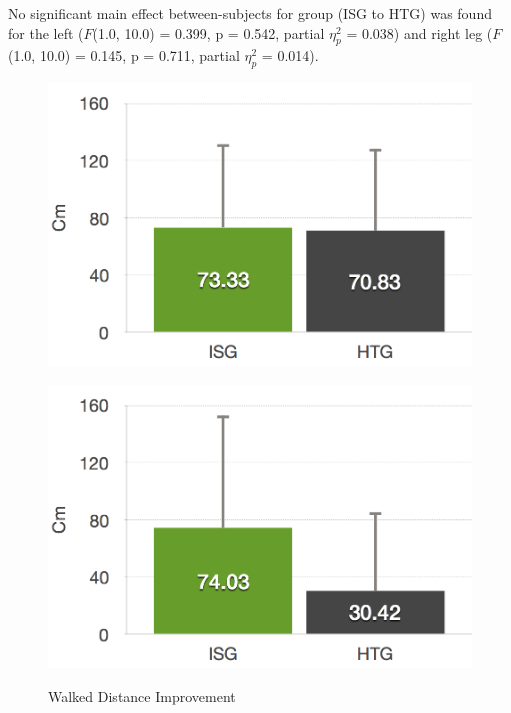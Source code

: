No significant main effect between-subjects for group (ISG to HTG) was found for the left ($F$(1.0, 10.0) = 0.399, p = 0.542, partial $\eta_{p}^{2}$ = 0.038) and right leg ($F$(1.0, 10.0) = 0.145, p = 0.711, partial $\eta_{p}^{2}$ = 0.014).
\begin{figure}[htb]
	\centering
	\begin{minipage}[t]{0.49\linewidth}
		\centering
		\includegraphics[width=1\linewidth]{Pictures/6_4_DIA_DistanceLeftDiff}
		\label{fig:6_4_distanceLeftImprovement}
	\end{minipage}
	\hfill
	\begin{minipage}[t]{0.49\linewidth}
		\centering
		\includegraphics[width=1\linewidth]{Pictures/6_4_DIA_DistanceRightDiff}
		\label{fig:6_4_distanceRightImprovement}
	\end{minipage}
	\caption{Walked Distance Improvement}
	\label{fig:6_4_distanceImprovement}
\end{figure}

